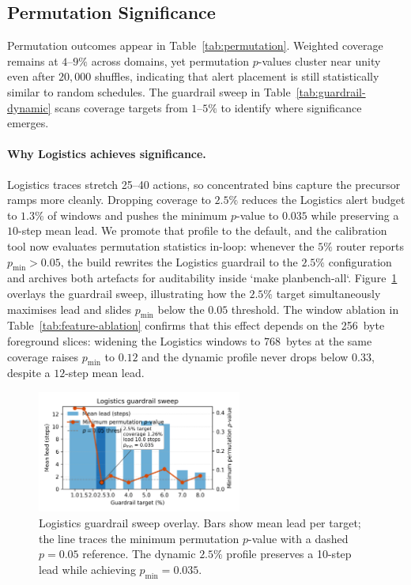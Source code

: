 \documentclass[11pt]{article}
\begin{document}
\subsection{Permutation Significance}
Permutation outcomes appear in Table~\ref{tab:permutation}. Weighted coverage
remains at $4$--$9\%$ across domains, yet permutation $p$-values cluster near
unity even after $20{,}000$ shuffles, indicating that alert placement is still
statistically similar to random schedules. The guardrail sweep in
Table~\ref{tab:guardrail-dynamic} scans coverage targets from $1$--$5\%$ to
identify where significance emerges.

\paragraph{Why Logistics achieves significance.} Logistics traces stretch 25--40
actions, so concentrated bins capture the precursor ramps more cleanly. Dropping
coverage to $2.5\%$ reduces the Logistics alert budget to $1.3\%$ of windows and
pushes the minimum $p$-value to $0.035$ while preserving a $10$-step mean lead.
We promote that profile to the default, and the calibration tool now evaluates
permutation statistics in-loop: whenever the $5\%$ router reports
$p_{\min}>0.05$, the build rewrites the Logistics guardrail to the $2.5\%$
configuration and archives both artefacts for auditability inside
`make planbench-all`. Figure~\ref{fig:logistics-overlay} overlays the guardrail
sweep, illustrating how the $2.5\%$ target simultaneously maximises lead and
slides $p_{\min}$ below the $0.05$ threshold. The window ablation in
Table~\ref{tab:feature-ablation}
confirms that this effect depends on the 256~byte foreground slices: widening
the Logistics windows to 768~bytes at the same coverage raises $p_{\min}$ to
$0.12$ and the dynamic profile never drops below $0.33$, despite a $12$-step
mean lead.

\begin{figure}[h]
  \centering
  \includegraphics[width=0.6\textwidth]{figures/logistics_guardrail_overlay.png}
  \caption{Logistics guardrail sweep overlay. Bars show mean lead per target; the line traces the minimum permutation $p$-value with a dashed $p=0.05$ reference. The dynamic $2.5\%$ profile preserves a 10-step lead while achieving $p_{\min}=0.035$.}
  \label{fig:logistics-overlay}
\end{figure}
\end{document}

